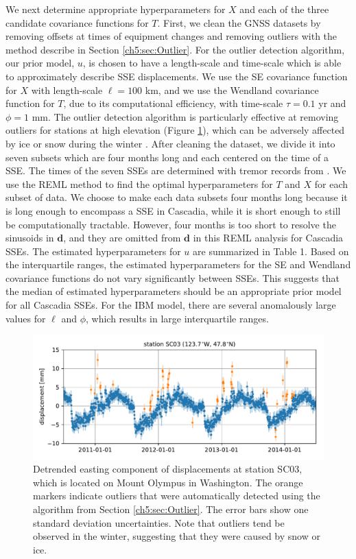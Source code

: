 We next determine appropriate hyperparameters for $X$ and each of the three candidate covariance functions for $T$. First, we clean the GNSS datasets by removing offsets at times of equipment changes and removing outliers with the method describe in Section \ref{ch5:sec:Outlier}. For the outlier detection algorithm, our prior model, $u$, is chosen to have a length-scale and time-scale which is able to approximately describe SSE displacements. We use the SE covariance function for $X$ with length-scale $\ell = 100$ km, and we use the Wendland covariance function for $T$, due to its computational efficiency, with time-scale $\tau = 0.1$ yr and $\phi = 1$ mm.  The outlier detection algorithm is particularly effective at removing outliers for stations at high elevation (Figure \ref{ch5:fig:Outliers}), which can be adversely affected by ice or snow during the winter \citep{Lisowski2008}. After cleaning the dataset, we divide it into seven subsets which are four months long and each centered on the time of a SSE. The times of the seven SSEs are determined with tremor records from \cite{Wech2010}. We use the REML method to find the optimal hyperparameters for $T$ and $X$ for each subset of data. We choose to make each data subsets four months long because it is long enough to encompass a SSE in Cascadia, while it is short enough to still be computationally tractable. However, four months is too short to resolve the sinusoids in $\mathbf{d}$, and they are omitted from $\mathbf{d}$ in this REML analysis for Cascadia SSEs. The estimated hyperparameters for $u$ are summarized in Table 1. Based on the interquartile ranges, the estimated hyperparameters for the SE and Wendland covariance functions do not vary significantly between SSEs. This suggests that the median of estimated hyperparameters should be an appropriate prior model for all Cascadia SSEs. For the IBM model, there are several anomalously large values for $\ell$ and $\phi$, which results in large interquartile ranges.   

\begin{figure}
\includegraphics{ch5/figures/outliers/outliers.pdf}
\caption{Detrended easting component of displacements at station SC03, which is located on Mount Olympus in Washington. The orange markers indicate outliers that were automatically detected using the algorithm from Section \ref{ch5:sec:Outlier}. The error bars show one standard deviation uncertainties. Note that outliers tend be observed in the winter, suggesting that they were caused by snow or ice.}   
\label{ch5:fig:Outliers}
\end{figure}

